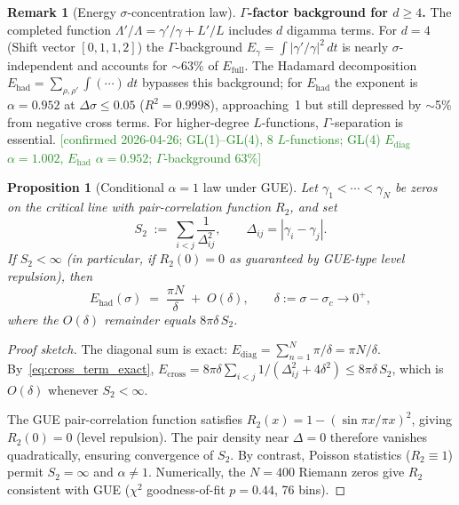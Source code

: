 \documentclass[11pt, a4paper]{article}
\theoremstyle{definition}
\newtheorem{remark}{Remark}[section]
\theoremstyle{plain}
\newtheorem{proposition}[theorem]{Proposition}
\begin{document}
\begin{remark}[Energy $\sigma$-concentration law]
\smallskip\noindent
\textbf{$\Gamma$-factor background for $d\geq 4$.}\;
The completed function $\Lambda'/\Lambda = \gamma'/\gamma + L'/L$
includes $d$ digamma terms.  For $d=4$ (Shift vector $[0,1,1,2]$) the
$\Gamma$-background $E_\gamma=\int|\gamma'/\gamma|^2\,dt$ is nearly
$\sigma$-independent and accounts for $\sim$63\% of $E_{\mathrm{full}}$.
The Hadamard decomposition $E_{\mathrm{had}}=\sum_{\rho,\rho'}\int
(\cdots)\,dt$ bypasses this background; for $E_{\mathrm{had}}$ the
exponent is $\alpha=0.952$ at $\Delta\sigma\leq 0.05$ ($R^2=0.9998$),
approaching~1 but still depressed by $\sim$5\% from negative cross terms.
For higher-degree $L$-functions, $\Gamma$-separation is essential.
\textcolor{ForestGreen}{[confirmed 2026-04-26;
GL(1)--GL(4), 8 $L$-functions; GL(4) $E_{\mathrm{diag}}$ $\alpha=1.002$,
$E_{\mathrm{had}}$ $\alpha=0.952$; $\Gamma$-background 63\%]}
\end{remark}

\begin{proposition}[Conditional $\alpha=1$ law under GUE]
\label{prop:conditional_alpha1}
Let $\gamma_1<\cdots<\gamma_N$ be zeros on the critical line with
pair-correlation function $R_2$, and set
\[
  S_2 \;:=\; \sum_{i<j}\frac{1}{\Delta_{ij}^{2}},
  \qquad \Delta_{ij}=|\gamma_i-\gamma_j|.
\]
If\/ $S_2<\infty$
\textup{(}in particular, if $R_2(0)=0$ as guaranteed by GUE-type
level repulsion\textup{)}, then
\[
  E_{\mathrm{had}}(\sigma)
    \;=\; \frac{\pi N}{\delta}
    \;+\; O(\delta),
  \qquad \delta:=\sigma-\sigma_c\to 0^{+},
\]
where the $O(\delta)$ remainder equals $8\pi\delta\,S_2$.
\end{proposition}

\begin{proof}[Proof sketch]
The diagonal sum is exact:
$E_{\mathrm{diag}}=\sum_{n=1}^{N}\pi/\delta=\pi N/\delta$.
By~\eqref{eq:cross_term_exact},
$E_{\mathrm{cross}}
 =8\pi\delta\sum_{i<j}1/(\Delta_{ij}^{2}+4\delta^{2})
 \leq 8\pi\delta\,S_2$,
which is $O(\delta)$ whenever $S_2<\infty$.

The GUE pair-correlation function satisfies
$R_2(x)=1-(\sin\pi x/\pi x)^{2}$, giving $R_2(0)=0$ (level repulsion).
The pair density near $\Delta=0$ therefore vanishes quadratically,
ensuring convergence of $S_2$.
By contrast, Poisson statistics ($R_2\equiv 1$) permit $S_2=\infty$
and $\alpha\neq 1$.
Numerically, the $N=400$ Riemann zeros give $R_2$ consistent with
GUE ($\chi^{2}$ goodness-of-fit $p=0.44$, 76 bins).
\end{proof}
\end{document}
